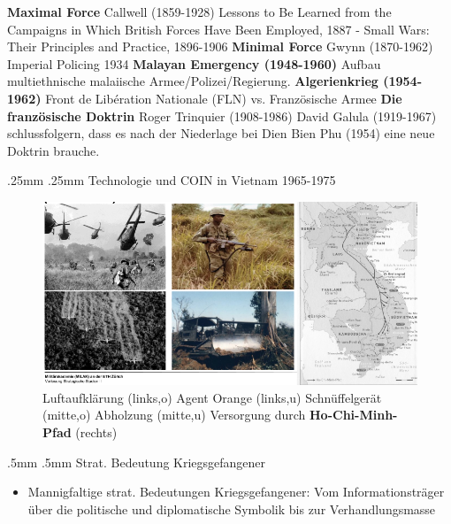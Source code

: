 {}\documentclass[a4paper,landscape,twoside]{article}
\makeatletter
\renewcommand{\section}{\@startsection{section}{1}{\z@}%
	{.5mm}%
	{.5mm}%
	{\normalfont\normalsize\bfseries}}
\renewcommand{\subsection}{\@startsection{subsection}{2}{\z@}%
	{.25mm}%
	{.25mm}%
	{\normalfont\small\bfseries}}
\makeatother
\begin{document}
\begin{multicols}{4}
	\textbf{Maximal Force}
	Callwell (1859-1928)
	Lessons to Be Learned from the Campaigns in Which British Forces
	Have Been Employed, 1887 -
	Small Wars: Their Principles and Practice, 1896-1906
	\textbf{Minimal Force}
	Gwynn (1870-1962)
	Imperial Policing 1934
	\textbf{Malayan Emergency (1948-1960)}
	Aufbau multiethnische malaiische Armee/Polizei/Regierung.
	\textbf{Algerienkrieg (1954-1962)}
	Front de Libération Nationale (FLN) vs.
	Französische Armee
	\textbf{Die französische Doktrin}
	Roger Trinquier (1908-1986)
	David Galula (1919-1967)
	schlussfolgern, dass es nach der
	Niederlage bei Dien Bien Phu (1954) eine neue Doktrin brauche.

	\subsection{Technologie und COIN in Vietnam
		1965-1975}

	\begin{figure}[H]
		\centering
		\includegraphics[width=\columnwidth]{images/vietnam.png}
		\caption{
			Luftaufklärung (links,o)
			Agent Orange (links,u)
			Schnüffelgerät (mitte,o)
			Abholzung (mitte,u)
			Versorgung durch \textbf{Ho-Chi-Minh-Pfad} (rechts)
		}
	\end{figure}


	\section{Strat. Bedeutung Kriegsgefangener}

	\begin{itemize}

		\item
		      Mannigfaltige strat. Bedeutungen Kriegsgefangener: Vom
		      Informationsträger über die politische und diplomatische Symbolik bis
		      zur Verhandlungsmasse
	\end{itemize}


\end{multicols}
\end{document}
